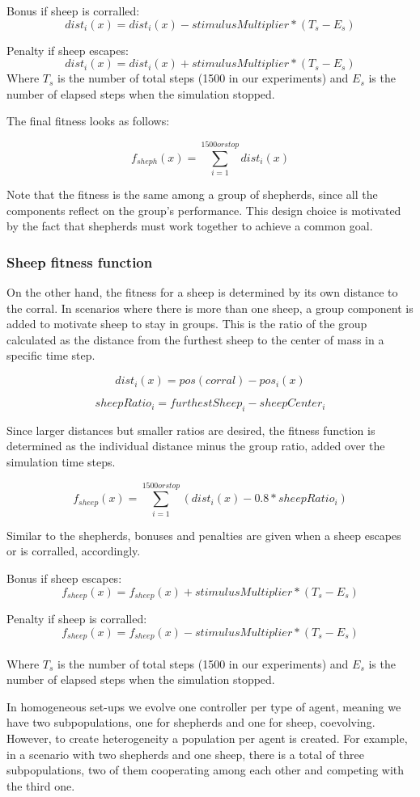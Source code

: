 \documentclass[conference]{IEEEtran}
\begin{document}
Bonus if sheep is corralled:
$$ dist_i(x) = dist_i(x) - stimulusMultiplier * (T_s - E_s) $$

Penalty if sheep escapes:
$$ dist_i(x) = dist_i(x) + stimulusMultiplier * (T_s - E_s) $$
Where $T_s$ is the number of total steps (1500 in our experiments) and $E_s$ is the number of elapsed steps when the simulation stopped.

The final fitness looks as follows: 

$$ f_{sheph}(x) = \sum_{i=1}^{1500 or stop} dist_i(x) $$

Note that the fitness is the same among a group of shepherds, since all the components reflect on the group's performance. This design choice is motivated by the fact that shepherds must work together to achieve a common goal. 

\vspace{1em}
\subsubsection{Sheep fitness function}
On the other hand, the fitness for a sheep is determined by its own distance to the corral. In scenarios where there is more than one sheep, a group component is added to motivate sheep to stay in groups. This is the ratio of the group calculated as the distance from the furthest sheep to the center of mass in a specific time step. 

$$ dist_i(x) = pos(corral) - pos_i(x) $$

$$ sheepRatio_i = furthestSheep_i - sheepCenter_i $$

Since larger distances but smaller ratios are desired, the fitness function is determined as the individual distance minus the group ratio, added over the simulation time steps. 

$$ f_{sheep}(x) = \sum_{i=1}^{1500 or stop}(dist_i(x) - 0.8 * sheepRatio_i) $$

Similar to the shepherds, bonuses and penalties are given when a sheep escapes or is corralled, accordingly.  

Bonus if sheep escapes:
$$ f_{sheep}(x) = f_{sheep}(x) + stimulusMultiplier * (T_s - E_s) $$

Penalty if sheep is corralled:
$$ f_{sheep}(x) = f_{sheep}(x) - stimulusMultiplier * (T_s - E_s) $$\\
Where $T_s$ is the number of total steps (1500 in our experiments) and $E_s$ is the number of elapsed steps when the simulation stopped.

In homogeneous set-ups we evolve one controller per type of agent, meaning we have two subpopulations, one for shepherds and one for sheep, coevolving. However, to create heterogeneity a population per agent is created. For example, in a scenario with two shepherds and one sheep, there is a total of three subpopulations, two of them cooperating among each other and competing with the third one.  
\end{document}
